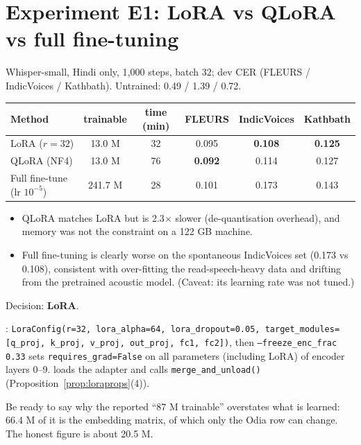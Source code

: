 \section{Experiment E1: LoRA vs QLoRA vs full fine-tuning}

Whisper-small, Hindi only, 1{,}000 steps, batch 32; dev CER (FLEURS / IndicVoices / Kathbath). Untrained: 0.49 / 1.39 / 0.72.

\begin{center}
\begin{tabular}{lccccc}
\toprule
Method & trainable & time (min) & FLEURS & IndicVoices & Kathbath\\
\midrule
LoRA ($r=32$) & 13.0 M & 32 & 0.095 & \textbf{0.108} & \textbf{0.125}\\
QLoRA (NF4) & 13.0 M & 76 & \textbf{0.092} & 0.114 & 0.127\\
Full fine-tune (lr $10^{-5}$) & 241.7 M & 28 & 0.101 & 0.173 & 0.143\\
\bottomrule
\end{tabular}
\end{center}

\begin{itemize}
\item QLoRA matches LoRA but is 2.3$\times$ slower (de-quantisation overhead), and memory was not the constraint on a 122 GB machine.
\item Full fine-tuning is clearly worse on the spontaneous IndicVoices set (0.173 vs 0.108), consistent with over-fitting the
read-speech-heavy data and drifting from the pretrained acoustic model. (Caveat: its learning rate was not tuned.)
\end{itemize}
Decision: \textbf{LoRA}.

\begin{incode}
: \texttt{LoraConfig(r=32, lora\_alpha=64, lora\_dropout=0.05, target\_modules=[q\_proj, k\_proj, v\_proj,
out\_proj, fc1, fc2])}, then \texttt{--freeze\_enc\_frac 0.33} sets \texttt{requires\_grad=False} on all parameters (including
LoRA) of encoder layers 0--9.  loads the adapter and calls \texttt{merge\_and\_unload()} (Proposition~\ref{prop:loraprops}(4)).
\end{incode}

\begin{vivatip}
Be ready to say why the reported ``87 M trainable'' overstates what is learned: 66.4 M of it is the embedding matrix, of which only
the Odia row can change. The honest figure is about 20.5 M.
\end{vivatip}
